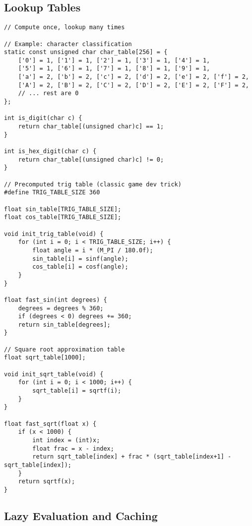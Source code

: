 \subsection{Lookup Tables}

\begin{lstlisting}
// Compute once, lookup many times

// Example: character classification
static const unsigned char char_table[256] = {
    ['0'] = 1, ['1'] = 1, ['2'] = 1, ['3'] = 1, ['4'] = 1,
    ['5'] = 1, ['6'] = 1, ['7'] = 1, ['8'] = 1, ['9'] = 1,
    ['a'] = 2, ['b'] = 2, ['c'] = 2, ['d'] = 2, ['e'] = 2, ['f'] = 2,
    ['A'] = 2, ['B'] = 2, ['C'] = 2, ['D'] = 2, ['E'] = 2, ['F'] = 2,
    // ... rest are 0
};

int is_digit(char c) {
    return char_table[(unsigned char)c] == 1;
}

int is_hex_digit(char c) {
    return char_table[(unsigned char)c] != 0;
}

// Precomputed trig table (classic game dev trick)
#define TRIG_TABLE_SIZE 360

float sin_table[TRIG_TABLE_SIZE];
float cos_table[TRIG_TABLE_SIZE];

void init_trig_table(void) {
    for (int i = 0; i < TRIG_TABLE_SIZE; i++) {
        float angle = i * (M_PI / 180.0f);
        sin_table[i] = sinf(angle);
        cos_table[i] = cosf(angle);
    }
}

float fast_sin(int degrees) {
    degrees = degrees % 360;
    if (degrees < 0) degrees += 360;
    return sin_table[degrees];
}

// Square root approximation table
float sqrt_table[1000];

void init_sqrt_table(void) {
    for (int i = 0; i < 1000; i++) {
        sqrt_table[i] = sqrtf(i);
    }
}

float fast_sqrt(float x) {
    if (x < 1000) {
        int index = (int)x;
        float frac = x - index;
        return sqrt_table[index] + frac * (sqrt_table[index+1] - sqrt_table[index]);
    }
    return sqrtf(x);
}
\end{lstlisting}

\subsection{Lazy Evaluation and Caching}

